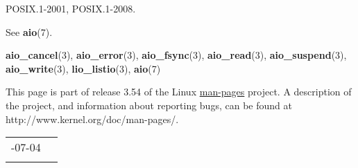 \documentclass[]{article}
\let\realtextbf=\textbf
\renewcommand{\textbf}[1]{\textcolor{boldcolor}{\realtextbf{#1}}}
\renewcommand{\emph}[1]{\underline{#1}}
\begin{document}
POSIX.1-2001, POSIX.1-2008.


See \textbf{aio}(7).


\textbf{aio\_cancel}(3), \textbf{aio\_error}(3), \textbf{aio\_fsync}(3),
\textbf{aio\_read}(3), \textbf{aio\_suspend}(3), \textbf{aio\_write}(3),
\textbf{lio\_listio}(3), \textbf{aio}(7)


This page is part of release 3.54 of the Linux \emph{man-pages} project.
A description of the project, and information about reporting bugs, can
be found at http://www.kernel.org/doc/man-pages/.

\begin{longtable}[c]{@{}ll@{}}
\toprule\addlinespace
2013-07-04 &
\\\addlinespace
\bottomrule
\end{longtable}
\end{document}
